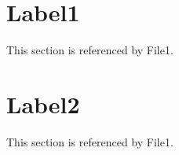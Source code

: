 \documentclass{article}
\begin{document}
\section{Label1}\label{label1}

This section is referenced by File1.

\section{Label2}\label{label2}

This section is referenced by File1.
\end{document}
